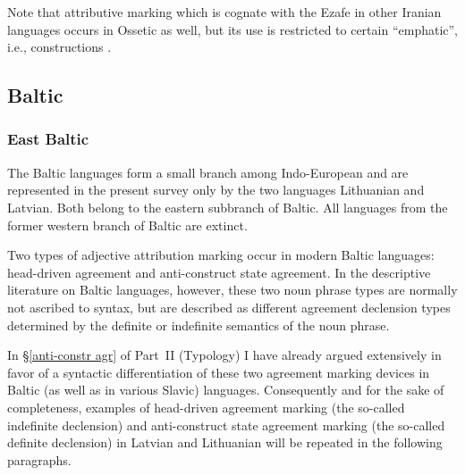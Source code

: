 Note that attributive  marking which is cognate with the Ezafe in other Iranian languages occurs in Ossetic as well, but its use is restricted to certain “emphatic”, i.e.,  constructions \citep[467]{thodarson1989}.

\subsection{Baltic}
\label{baltic synchr}
\subsubsection{East Baltic}
The Baltic languages form a small branch among Indo-European and are represented in the present survey only by the two languages Lithuanian and Latvian. Both belong to the eastern subbranch of Baltic. All languages from the former western branch of Baltic are extinct.

Two types of adjective attribution marking occur in modern Baltic languages: head\hyp{}driven agreement and anti\hyp{}construct state agreement. In the descriptive literature on Baltic languages, however, these two noun phrase types are normally not ascribed to syntax, but are described as different agreement declension types determined by the definite or indefinite semantics of the noun phrase.

In \S\ref{anti-constr agr} of Part~II (Typology) I have already argued extensively in favor of a syntactic differentiation of these two agreement marking devices in Baltic (as well as in various Slavic) languages. Consequently and for the sake of completeness, examples of head\hyp{}driven agreement marking (the so-called indefinite declension) and anti\hyp{}construct state agreement marking (the so-called definite declension) in Latvian and Lithuanian will be repeated in the following paragraphs.

